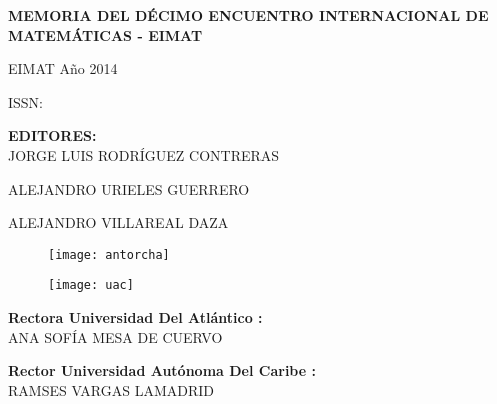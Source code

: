 \documentclass[lettersize,twocolumn,balance,spanish,svgnames,x11names,x11names,HTML]{book}
\begin{document}
\pagestyle{empty}
\footnotesize

\pagecolor{ptcbackground}
 \vfill
{\color{white}
\bfseries \setlength\parindent{0pt}
\begin{center}

\begin{mdframed}[backgroundcolor=ptctitle,hidealllines=true]
\parbox[t]{\dimexpr\textwidth-2\fboxsep\relax}{  \color{white}\bfseries\sffamily  \uppercase{Memoria Del D\'ecimo Encuentro Internacional de Matem\'aticas - EIMAT} }
\end{mdframed}

EIMAT A\~no 2014

ISSN:\vfill

\colorbox{ptctitle}{\color{white}\bfseries\sffamily EDITORES:}\\[5pt]

JORGE LUIS RODR\'IGUEZ CONTRERAS

ALEJANDRO URIELES GUERRERO

ALEJANDRO VILLAREAL DAZA

\vfill

 \begin{multicols}{2} 

\begin{figure}[H]
\centering\texttt{[image: antorcha]}
\end{figure}
 
\begin{figure}[H]
\centering\texttt{[image: uac]}
\end{figure}


 \end{multicols} 

\vfill

 \begin{multicols}{2} 

\colorbox{ptctitle}{\color{white}\bfseries\sffamily Rectora Universidad Del Atl\'antico :}\\[5pt]

ANA SOF\'IA MESA DE CUERVO

\colorbox{ptctitle}{\color{white}\bfseries\sffamily Rector Universidad Aut\'onoma Del Caribe :}\\[5pt]

\uppercase{ Ramses Vargas Lamadrid}

 \end{multicols} 


\end{center}}
\end{document}
